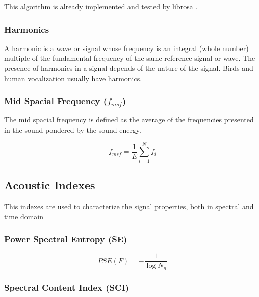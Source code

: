 This algorithm is already implemented and tested by librosa \cite{yin, librosa}.

\subsubsection{Harmonics}

A harmonic is a wave or signal whose frequency is an integral (whole number) multiple of the fundamental frequency of the same reference signal or wave. The presence of harmonics in a signal depends of the nature of the signal. Birds and human vocalization usually have harmonics.

\subsubsection{Mid Spacial Frequency ($f_{msf}$)}

The mid spacial frequency is defined as the average of the frequencies presented in the sound pondered by the sound energy.

\begin{equation}
    f_{msf} = \frac{1}{E} \sum_{i=1}^N f_i 
\end{equation}



\subsection{Acoustic Indexes}

This indexes are used to characterize the signal properties, both in spectral and time domain
\subsubsection{Power Spectral Entropy (SE)}

\begin{equation}\label{eq_spectral_entropy}
  PSE (F) = -\frac{1}{\log N_n}   
\end{equation}



\subsubsection{Spectral Content Index (SCI)}

